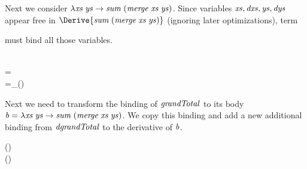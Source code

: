 Next we consider \ensuremath{\lambda \Varid{xs}\;\Varid{ys}\to \Varid{sum}\;(\Varid{merge}\;\Varid{xs}\;\Varid{ys})}.
Since variables \ensuremath{\Varid{xs},\Varid{dxs},\Varid{ys},\Varid{dys}} appear free in \ensuremath{\Derive{\Varid{sum}\;(\Varid{merge}\;\Varid{xs}\;\Varid{ys})}} (ignoring later
optimizations), term
\begin{hscode}\SaveRestoreHook
{}%
%
\>[B]{}\<[E]%
\ColumnHook
\end{hscode}\resethooks
must bind all those variables.

\begin{hscode}\SaveRestoreHook
{}%
%
%
%
\>[13]{}\<[E]%
\\
\>[3]{}={}\<[13]%
\>[13]{}\lambda {}\;\;\;\to {}\<[E]%
\\
\>[3]{}=_{\beta}{}\<[13]%
\>[13]{}\lambda {}\;\;\;\to {}\;(\;\;){}\<[E]%
\ColumnHook
\end{hscode}\resethooks

Next we need to transform the binding of \ensuremath{\Varid{grandTotal}} to its body \ensuremath{\Varid{b}\mathrel{=}\lambda \Varid{xs}\;\Varid{ys}\to \Varid{sum}\;(\Varid{merge}\;\Varid{xs}\;\Varid{ys})}. We copy this binding and add a new additional binding from \ensuremath{\Varid{dgrandTotal}} to the derivative of \ensuremath{\Varid{b}}.

\begin{hscode}\SaveRestoreHook
{}%
%
%
%
%
%
%
%
%
%
\>[B]{}\<[14]%
\>[14]{}\mathrel{=}\lambda {}\;{}\<[26]%
\>[26]{}\<[34]%
\>[34]{}\to {}\<[34E]%
\>[38]{}\;{}\<[43]%
\>[43]{}(\;{}\<[51]%
\>[51]{}\;{}\<[56]%
\>[56]{}){}\<[E]%
\\
\>[B]{}\<[14]%
\>[14]{}\mathrel{=}\lambda {}\;\;{}\<[26]%
\>[26]{}\;\<[34]%
\>[34]{}\to {}\<[34E]%
\>[38]{}\;{}\<[43]%
\>[43]{}(\;{}\<[51]%
\>[51]{}\;{}\<[56]%
\>[56]{}){}\<[E]%
\ColumnHook
\end{hscode}\resethooks

